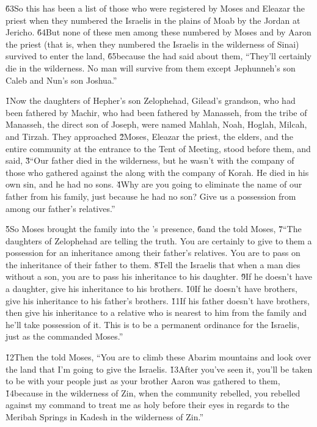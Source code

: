 \v{63}So this has been a list of those who were registered by Moses and Eleazar the priest when they numbered the Israelis in the plains of Moab by the Jordan at Jericho. \v{64}But none of these men among these numbered by Moses and by Aaron the priest (that is, when they numbered the Israelis in the wilderness of Sinai) survived to enter the land, \v{65}because the  had said about them, ``They'll certainly die in the wilderness. No man will survive from them except Jephunneh's son Caleb and Nun's son Joshua.''

\v{1}Now the daughters of Hepher's son Zelophehad, Gilead's grandson, who had been fathered by Machir, who had been fathered by Manasseh, from the tribe of Manasseh, the direct son of Joseph, were named Mahlah, Noah, Hoglah, Milcah, and Tirzah. They approached \v{2}Moses, Eleazar the priest, the elders, and the entire community at the entrance to the Tent of Meeting, stood before them, and said, \v{3}``Our father died in the wilderness, but he wasn't with the company of those who gathered against the  along with the company of Korah. He died in his own sin, and he had no sons. \v{4}Why are you going to eliminate the name of our father from his family, just because he had no son? Give us a possession from among our father's relatives.''

\v{5}So Moses brought the family into the 's presence, \v{6}and the  told Moses, \v{7}``The daughters of Zelophehad are telling the truth. You are certainly to give to them a possession for an inheritance among their father's relatives. You are to pass on the inheritance of their father to them. \v{8}Tell the Israelis that when a man dies without a son, you are to pass his inheritance to his daughter. \v{9}If he doesn't have a daughter, give his inheritance to his brothers. \v{10}If he doesn't have brothers, give his inheritance to his father's brothers. \v{11}If his father doesn't have brothers, then give his inheritance to a relative who is nearest to him from the family and he'll take possession of it. This is to be a permanent ordinance for the Israelis, just as the  commanded Moses.''

\v{12}Then the  told Moses, ``You are to climb these Abarim mountains and look over the land that I'm going to give the Israelis. \v{13}After you've seen it, you'll be taken to be with your people just as your brother Aaron was gathered to them, \v{14}because in the wilderness of Zin, when the community rebelled, you rebelled against my command to treat me as holy before their eyes in regards to the Meribah Springs in Kadesh in the wilderness of Zin.''

